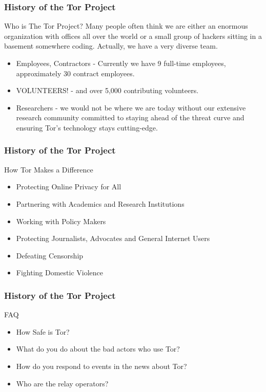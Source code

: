 \documentclass{beamer}
\begin{document}
\begin{frame}
\frametitle{History of the Tor Project}
	\begin{block}{Who is The Tor Project?}
          Many people often think we are either an enormous organization with offices all over the world or a small group of hackers sitting in a basement somewhere coding. Actually, we have a very diverse team.
		\begin{itemize}
			\item<1-> Employees, Contractors - Currently we have 9 full-time employees, approximately 30 contract employees. \pause
			\item<2-> VOLUNTEERS! - and over 5,000 contributing volunteers. \pause
			\item<3-> Researchers - we would not be where we are today without our extensive research community committed to staying ahead of the threat curve and ensuring Tor's technology stays cutting-edge.
		\end{itemize}
	\end{block}
\end{frame}

\begin{frame}
\frametitle{History of the Tor Project}
	\begin{block}{How Tor Makes a Difference}
		\begin{itemize}
			\item<1-> Protecting Online Privacy for All
			\item<2-> Partnering with Academics and Research Institutions
			\item<3-> Working with Policy Makers
			\item<4-> Protecting Journalists, Advocates and General Internet Users
			\item<5-> Defeating Censorship
			\item<6-> Fighting Domestic Violence
		\end{itemize}
	\end{block}
\end{frame}

\begin{frame}
\frametitle{History of the Tor Project}
	\begin{block}{FAQ}
		\begin{itemize}
			\item<1-> How Safe is Tor?
			\item<2-> What do you do about the bad actors who use Tor?
			\item<3-> How do you respond to events in the news about Tor?
			\item<4-> Who are the relay operators?
		\end{itemize}
	\end{block}
\end{frame}
\end{document}
